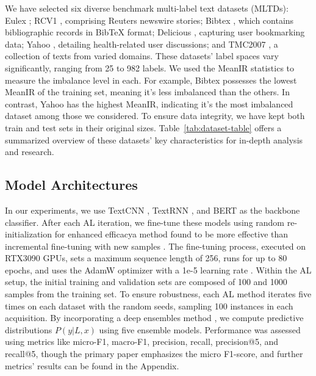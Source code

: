 \documentclass[letterpaper]{article} %
\begin{document}
We have selected six diverse benchmark multi-label text datasets (MLTDs): Eulex \cite{LozaMenca2010}; RCV1 \cite{10.5555/1005332.1005345}, comprising Reuters newswire stories; Bibtex \cite{Katakis2008MultilabelTC}, which contains bibliographic records in BibTeX format; Delicious \cite{Tsoumakas2008EffectiveAE}, capturing user bookmarking data; Yahoo \cite{10.5555/2968618.2968710}, detailing health-related user discussions; and TMC2007 \cite{1559692}, a collection of texts from varied domains.
These datasets' label spaces vary significantly, ranging from 25 to 982 labels. We used the MeanIR statistics to measure the imbalance level in each. 
For example, Bibtex possesses the lowest MeanIR of the training set, meaning it's less imbalanced than the others. In contrast, Yahoo has the highest MeanIR, indicating it's the most imbalanced dataset among those we considered.
To ensure data integrity, we have kept both train and test sets in their original sizes. Table~\ref{tab:dataset-table} offers a summarized overview of these datasets' key characteristics for in-depth analysis and research.






\subsection{Model Architectures}

In our experiments, we use TextCNN \cite{kim-2014-convolutional}, TextRNN \cite{8632592}, and BERT \cite{devlin-etal-2019-bert} as the backbone classifier.
After each AL iteration, we fine-tune these models using random re-initialization \cite{frankle2018lottery} for enhanced efficacya method found to be more effective than incremental fine-tuning with new samples \cite{gal2017deep}. The fine-tuning process, executed on RTX3090 GPUs, sets a maximum sequence length of 256, runs for up to 80 epochs, and uses the AdamW optimizer with a 1e-5 learning rate \cite{nguyen-etal-2022-hardness,Nguyen_Tan_Du_Buntine_Beare_Chen_2023,nguyen2023lowresource}. Within the AL setup, the initial training and validation sets are composed of 100 and 1000 samples from the training set. To ensure robustness, each AL method iterates five times on each dataset with the random seeds, sampling 100 instances in each acquisition. By incorporating a deep ensembles method \cite{10.5555/3295222.3295387}, we compute predictive distributions $P(y| L, x)$ using five ensemble models. Performance was assessed using metrics like micro-F1, macro-F1, precision, recall, precision@5, and recall@5, though the primary paper emphasizes the micro F1-score, and further metrics' results can be found in the Appendix.
\end{document}
